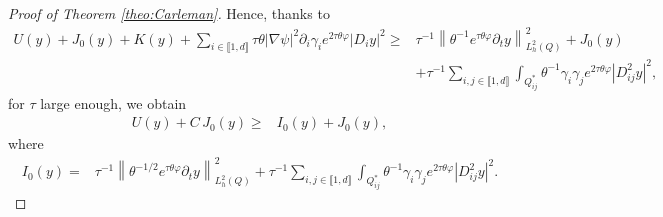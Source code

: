 \documentclass{amsart}
\numberwithin{equation}{section}
\begin{document}
\begin{proof}[Proof of Theorem \ref{theo:Carleman}]
Hence, thanks to 
\begin{align*}
    U(y)+J_0(y)+K(y)+\sum_{i\in\llbracket 1,d\rrbracket}\tau\theta|\nabla\psi|^{2}\partial_{i}\gamma_{i}e^{2\tau\theta\varphi}|D_{i}y|^{2}\geq &\tau^{-1}\left\| \theta^{-1}e^{\tau\theta\varphi}\partial_{t}y\right\|^{2}_{L_{h}^{2}(Q)}+J_0(y)\\
    &+\tau^{-1}\sum_{i,j\in\llbracket 1,d\rrbracket}\int_{Q^\ast_{ij}}\theta^{-1}\gamma_{i}\gamma_{j}e^{2\tau\theta\varphi}|D_{ij}^{2}y|^{2},
\end{align*}
for $\tau$ large enough, we obtain
\begin{align*}
    U(y)+C\,J_0(y)\geq &I_0(y)+J_0(y),
\end{align*}
where
\begin{align*}
    I_0(y)= &\tau^{-1}\left\| \theta^{-1/2}e^{\tau\theta\varphi}\partial_{t}y\right\|^{2}_{L_{h}^{2}(Q)}+\tau^{-1}\sum_{i,j\in\llbracket 1,d\rrbracket}\int_{Q^\ast_{ij}}\theta^{-1}\gamma_{i}\gamma_{j}e^{2\tau\theta\varphi}|D_{ij}^{2}y|^{2}.
\end{align*}


\end{proof}
\end{document}
